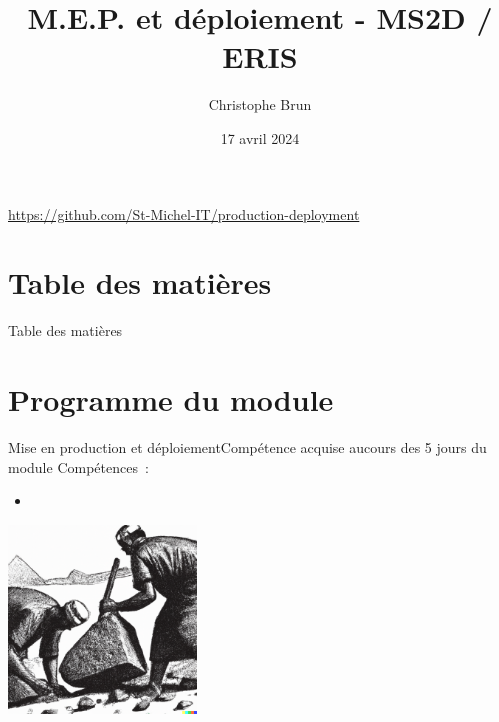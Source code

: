 \documentclass{beamer}
\title{M.E.P. et déploiement - MS2D / ERIS}
\author{Christophe Brun}
\institute{Campus Saint-Michel IT}
\date{17 avril 2024}
\begin{document}
    \begin{frame}
        \titlepage
        \centering
        \url{https://github.com/St-Michel-IT/production-deployment}
    \end{frame}


    \section{Table des matières}\label{sec:toc}

    \begin{frame}{Table des matières}
        \begin{multicols}{2}
            \tableofcontents
        \end{multicols}
    \end{frame}


    \section{Programme du module}\label{sec:programme-du-module}

    \begin{frame}{Mise en production et déploiement}{Compétence acquise aucours des 5 jours du module}
        Compétences~:
        \begin{itemize}
            \item {}
        \end{itemize}
        \bigbreak
        \centering
        \includegraphics[width=5cm]{image/engraving-of-egyptian-workers-pulling-stones}
    \end{frame}
\end{document}
